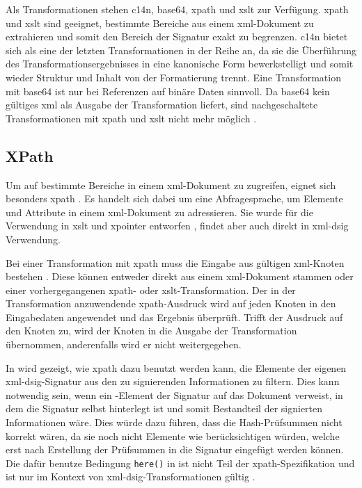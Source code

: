 Als Transformationen stehen \gls{c14n}, \gls{base64}, \gls{xpath} und \gls{xslt} zur Verfügung. \gls{xpath} und \gls{xslt} sind geeignet, bestimmte Bereiche aus
einem \gls{xml}-Dokument zu extrahieren und somit den Bereich der Signatur exakt zu begrenzen. \gls{c14n} bietet sich als eine der letzten
Transformationen in der Reihe an, da sie die Überführung des Transformationsergebnisses in eine kanonische Form bewerkstelligt und somit wieder Struktur und
Inhalt von der Formatierung trennt. Eine Transformation mit \gls{base64} ist nur bei Referenzen auf binäre Daten sinnvoll. Da \gls{base64} kein gültiges
\gls{xml} als Ausgabe der Transformation liefert, sind nachgeschaltete Transformationen mit \gls{xpath} und \gls{xslt} nicht mehr möglich \cite{xml-dsig:w3c}.

\subsection{XPath}
\label{sec:XML-DSig:Transformationen:XPath}
Um auf bestimmte Bereiche in einem \gls{xml}-Dokument zu zugreifen, eignet sich besonders \gls{xpath} \cite{xml:oreilly}. Es handelt sich dabei um eine
Abfragesprache, um Elemente und Attribute in einem \gls{xml}-Dokument zu adressieren. Sie wurde für die Verwendung in \gls{xslt} und \gls{xpointer} entworfen
\cite{xpath:w3c}, findet aber auch direkt in \gls{xml-dsig} Verwendung.

Bei einer Transformation mit \gls{xpath} muss die Eingabe aus gültigen \gls{xml}-Knoten bestehen \cite{xml-dsig:w3c}. Diese können entweder direkt aus einem
\gls{xml}-Dokument stammen oder einer vorhergegangenen \gls{xpath}- oder \gls{xslt}-Transformation. Der in der Transformation anzuwendende \gls{xpath}-Ausdruck
wird auf jeden Knoten in den Eingabedaten angewendet und das Ergebnis überprüft. Trifft der Ausdruck auf den Knoten zu, wird der Knoten in die Ausgabe der
Transformation übernommen, anderenfalls wird er nicht weitergegeben.

In  wird gezeigt, wie \gls{xpath} dazu benutzt werden kann, die Elemente der eigenen \gls{xml-dsig}-Signatur aus den zu
signierenden Informationen zu filtern. Dies kann notwendig sein, wenn ein -Element der Signatur auf das Dokument verweist, in dem die
Signatur selbst hinterlegt ist und somit Bestandteil der signierten Informationen wäre. Dies würde dazu führen, dass die Hash-Prüfsummen nicht korrekt wären, da
sie noch nicht Elemente wie  berücksichtigen würden, welche erst nach Erstellung der Prüfsummen in die Signatur eingefügt werden können.
Die dafür benutze Bedingung \texttt{here()} in  ist nicht Teil der \gls{xpath}-Spezifikation und ist nur im Kontext
von \gls{xml-dsig}-Transformationen gültig \cite{xml-dsig:w3c}.

